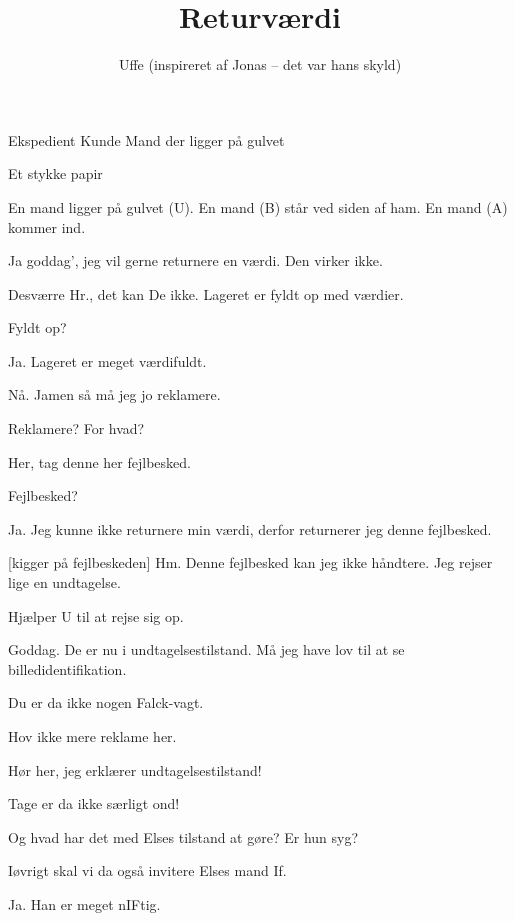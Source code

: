 \documentclass[danish]{article}
\title{Returværdi}
\author{Uffe (inspireret af Jonas -- det var hans skyld)}
\begin{document}
\maketitle

\begin{roles}
   Ekspedient
   Kunde
   Mand der ligger på gulvet
\end{roles}

\begin{props}
   Et stykke papir
\end{props}

\begin{sketch}

\scene En mand ligger på gulvet (U). En mand (B) står ved siden af ham. En
mand (A) kommer ind.

 Ja goddag', jeg vil gerne returnere en værdi. Den virker ikke.

 Desværre Hr., det kan De ikke. Lageret er fyldt op med værdier.

 Fyldt op?

 Ja. Lageret er meget værdifuldt.

 Nå. Jamen så må jeg jo reklamere.

 Reklamere? For hvad?

 Her, tag denne her fejlbesked.

 Fejlbesked?

 Ja. Jeg kunne ikke returnere min værdi, derfor returnerer jeg denne
fejlbesked. 

[kigger på fejlbeskeden] Hm. Denne fejlbesked kan jeg ikke håndtere. Jeg
rejser lige en undtagelse.

\scene Hjælper U til at rejse sig op.

 Goddag. De er nu i undtagelsestilstand. Må jeg have lov til at se
billedidentifikation.

 Du er da ikke nogen Falck-vagt.

 Hov ikke mere reklame her.

 Hør her, jeg erklærer undtagelsestilstand!

 Tage er da ikke særligt ond!

 Og hvad har det med Elses tilstand at gøre? Er hun syg?

 Iøvrigt skal vi da også invitere Elses mand If.

 Ja. Han er meget nIFtig.


\end{sketch}
\end{document}
